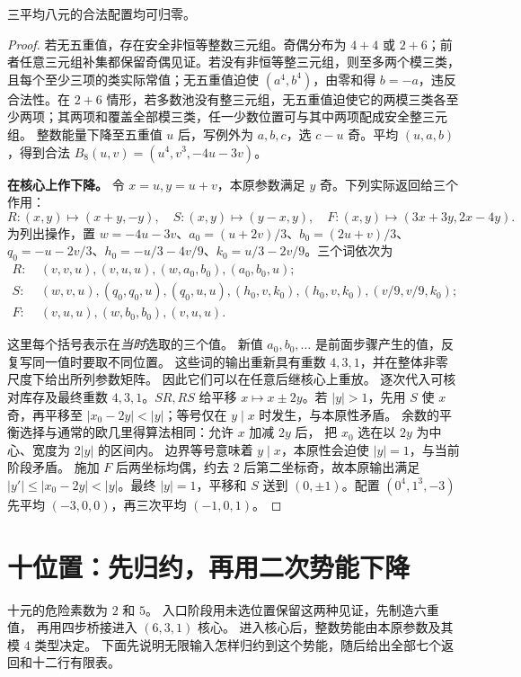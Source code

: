 \begin{lemma}[三平均八元的欧几里得下降]\label{lem:eight}
三平均八元的合法配置均可归零。
\end{lemma}
\begin{proof}
若无五重值，存在安全非恒等整数三元组。奇偶分布为 $4+4$ 或 $2+6$；前者任意三元组补集都保留奇偶见证。若没有非恒等整三元组，则至多两个模三类，且每个至少三项的类实际常值；无五重值迫使 $(a^4,b^4)$，由零和得 $b=-a$，违反合法性。在 $2+6$ 情形，若多数池没有整三元组，无五重值迫使它的两模三类各至少两项；其两项和覆盖全部模三类，任一少数位置可与其中两项配成安全整三元组。
整数能量下降至五重值 $u$ 后，写例外为 $a,b,c$，选 $c-u$ 奇。平均 $(u,a,b)$，得到合法 $B_8(u,v)=(u^4,v^3,-4u-3v)$。

\par\noindent\textbf{在核心上作下降。}
令 $x=u,y=u+v$，本原参数满足 $y$ 奇。下列实际返回给三个作用：
\[
R:(x,y)\mapsto(x+y,-y),\quad
S:(x,y)\mapsto(y-x,y),\quad
F:(x,y)\mapsto(3x+3y,2x-4y).
\]
为列出操作，置 $w=-4u-3v$、$a_0=(u+2v)/3$、$b_0=(2u+v)/3$、$q_0=-u-2v/3$、$h_0=-u/3-4v/9$、$k_0=u/3-2v/9$。三个词依次为
\begin{align*}
R:&\ (v,v,u),(v,u,u),(w,a_0,b_0),(a_0,b_0,u);\\
S:&\ (w,v,u),(q_0,q_0,u),(q_0,u,u),
(h_0,v,k_0),(h_0,v,k_0),(v/9,v/9,k_0);\\
F:&\ (v,u,u),(w,b_0,b_0),(v,u,u).
\end{align*}

这里每个括号表示在\emph{当时}选取的三个值。
新值 $a_0,b_0,\ldots$ 是前面步骤产生的值，反复写同一值时要取不同位置。
这些词的输出重新具有重数 $4,3,1$，并在整体非零尺度下给出所列参数矩阵。
因此它们可以在任意后继核心上重放。
逐次代入可核对库存及最终重数 $4,3,1$。$SR,RS$ 给平移 $x\mapsto x\pm2y$。若 $|y|>1$，先用 $S$ 使 $x$ 奇，再平移至 $|x_0-2y|<|y|$；等号仅在 $y\mid x$ 时发生，与本原性矛盾。
余数的平衡选择与通常的欧几里得算法相同：允许 $x$ 加减 $2y$ 后，
把 $x_0$ 选在以 $2y$ 为中心、宽度为 $2|y|$ 的区间内。
边界等号意味着 $y\mid x$，本原性会迫使 $|y|=1$，与当前阶段矛盾。
施加 $F$ 后两坐标均偶，约去 $2$ 后第二坐标奇，故本原输出满足 $|y'|\le|x_0-2y|<|y|$。最终 $|y|=1$，平移和 $S$ 送到 $(0,\pm1)$。配置 $(0^4,1^3,-3)$ 先平均 $(-3,0,0)$，再三次平均 $(-1,0,1)$。
\end{proof}


\section{十位置：先归约，再用二次势能下降}
十元的危险素数为 $2$ 和 $5$。
入口阶段用未选位置保留这两种见证，先制造六重值，
再用四步桥接进入 $(6,3,1)$ 核心。
进入核心后，整数势能由本原参数及其模 $4$ 类型决定。
下面先说明无限输入怎样归约到这个势能，随后给出全部七个返回和十二行有限表。

